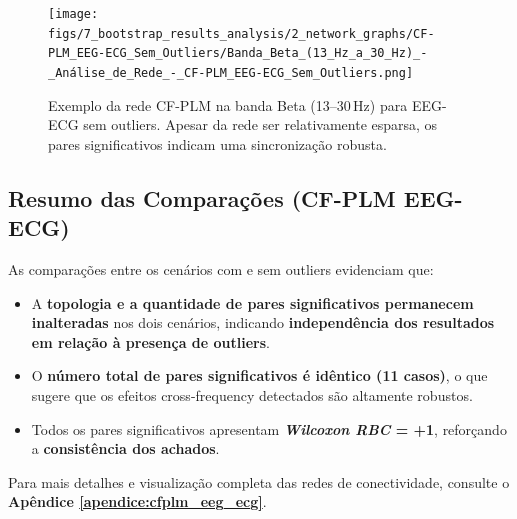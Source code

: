 \begin{figure}[htb]
  \centering
  \texttt{[image: figs/7\_bootstrap\_results\_analysis/2\_network\_graphs/CF-PLM\_EEG-ECG\_Sem\_Outliers/Banda\_Beta\_(13\_Hz\_a\_30\_Hz)\_-\_Análise\_de\_Rede\_-\_CF-PLM\_EEG-ECG\_Sem\_Outliers.png]}
  \caption{Exemplo da rede CF-PLM na banda Beta (13--30\,Hz) para EEG-ECG sem outliers. Apesar da rede ser relativamente esparsa, os pares significativos indicam uma sincronização robusta.}
  \label{fig:exemplo_rede_cfplm_beta_sem}
\end{figure}

\subsection{Resumo das Comparações (CF-PLM EEG-ECG)}

As comparações entre os cenários com e sem outliers evidenciam que:

\begin{itemize}
    \item A \textbf{topologia e a quantidade de pares significativos permanecem inalteradas} nos dois cenários, indicando \textbf{independência dos resultados em relação à presença de outliers}.
    \item O \textbf{número total de pares significativos é idêntico (11 casos)}, o que sugere que os efeitos cross-frequency detectados são altamente robustos.
    \item Todos os pares significativos apresentam \textbf{\emph{Wilcoxon RBC} = +1}, reforçando a \textbf{consistência dos achados}.
\end{itemize}

Para mais detalhes e visualização completa das redes de conectividade, consulte o \textbf{Apêndice \ref{apendice:cfplm_eeg_ecg}}.
